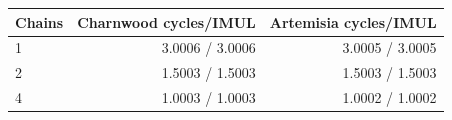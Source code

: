 \begin{tabular}{lrr}
\toprule
Chains & Charnwood cycles/IMUL & Artemisia cycles/IMUL \\
\midrule
1 & 3.0006 / 3.0006 & 3.0005 / 3.0005 \\
2 & 1.5003 / 1.5003 & 1.5003 / 1.5003 \\
4 & 1.0003 / 1.0003 & 1.0002 / 1.0002 \\
\bottomrule
\end{tabular}
